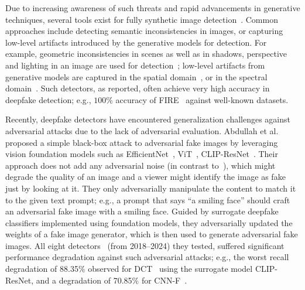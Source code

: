 \documentclass[letterpaper,twocolumn,10pt]{article}
\begin{document}
Due to increasing awareness of such threats and rapid advancements in generative techniques, several tools exist for fully synthetic image detection~\cite{Wang2023dire,Tran2025diffcor,Chu2025fire,Karageorgiou2025anyresolution,Ricker2024detection,Tan2024upsampling,yang2025d3,Cheng2025cospy,Huang2025sida,Wang2023dynamicgraphlearning,Brokman2025manifold,Zheng2024semanticartifacts,Corvi2023intriguing,Wolter2022wavelet,Sarkar2024shadows,Lorch2024landscape}. 
Common approaches include detecting semantic inconsistencies in images, or capturing low-level artifacts introduced by the generative models for detection. For example, geometric inconsistencies in scenes as well as in shadows, perspective  and lighting in an image are used for detection~\cite{Sarkar2024shadows}; low-level artifacts from generative models are captured in the spatial domain~\cite{Wang2024cnngenerated}, or in the spectral domain~\cite{Li2024masksim}. Such detectors, as reported, often achieve very high accuracy in deepfake detection; e.g., $100\%$ accuracy of FIRE~\cite{Chu2025fire} against well-known datasets. 

Recently,  deepfake  detectors have encountered generalization challenges against adversarial attacks due to the lack of adversarial evaluation. Abdullah et al.~\cite{Sifat2024evolvingthreat} proposed a simple black-box attack to adversarial fake images by leveraging vision foundation models such as EfficientNet~\cite{pmlr-v97-tan19a}, ViT~\cite{dosovitskiy2021imageworth16x16words}, CLIP-ResNet~\cite{Radford2021Naturallanguage}. Their approach does not add any adversarial noise (in contrast to~\cite{eddoubi2025raiddatasettestingadversarial,Hou2023adversarial}), which might degrade the quality of an image and a viewer might identify the image as fake just by looking at it. They only adversarially manipulate the content to match it to the given text prompt; e.g., a prompt that says ``a smiling face'' should craft an adversarial fake image with a smiling face. Guided by surrogate deepfake classifiers implemented using foundation models, they adversarially updated the weights of a fake image generator, which is then used to generate adversarial fake images.
%
All eight detectors~\cite{Ricker2024detection, Sha2023DE-FAKE, Ojha2023ufd, Wang2024cnngenerated, chai2020makesfakeimagesdetectable, he2021Resynthesis, liu2020globaltextureenhancementfake, MesoNet2018afchar} (from 2018--2024) they tested, suffered significant performance degradation against such adversarial attacks; e.g., the worst recall degradation of 88.35$\%$  observed for DCT~\cite{Ricker2024detection} using the surrogate model CLIP-ResNet, and  a degradation of 70.85$\%$ for CNN-F~\cite{Wang2024cnngenerated}. 
\end{document}
